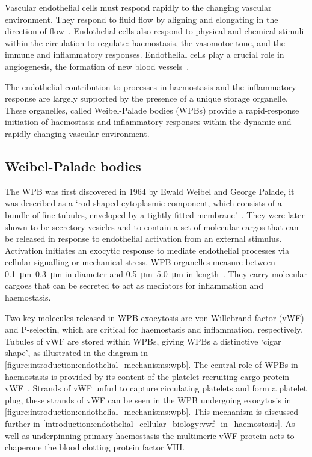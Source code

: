 Vascular endothelial cells must respond rapidly to the changing vascular environment. They respond to fluid flow by aligning and elongating in the direction of flow~\cite{Eskin1984}. Endothelial cells also respond to physical and chemical stimuli within the circulation to regulate: haemostasis, the vasomotor tone, and the immune and inflammatory responses. Endothelial cells play a crucial role in angiogenesis, the formation of new blood vessels~\cite{Sumpio2002}.

The endothelial contribution to processes in haemostasis and the inflammatory response are largely supported by the presence of a unique storage organelle. These organelles, called Weibel-Palade bodies (WPBs) provide a rapid-response initiation of haemostasis and inflammatory responses within the dynamic and rapidly changing vascular environment.

\subsection{Weibel-Palade bodies}
\label{introduction:endothelial_cellular_biology:wpb}
The WPB was first discovered in 1964 by Ewald Weibel and George Palade, it was described as a `rod-shaped cytoplasmic component, which consists of a bundle of fine tubules, enveloped by a tightly fitted membrane'~\cite{Weibel1964}. They were later shown to be secretory vesicles and to contain a set of molecular cargos that can be released in response to endothelial activation from an external stimulus. Activation initiates an exocytic response to mediate endothelial processes via cellular signalling or mechanical stress. WPB organelles measure between \SIrange{0.1}{0.3}{\micro\meter} in diameter and \SIrange{0.5}{5.0}{\micro\meter} in length~\cite{Ferraro2014}. They carry molecular cargoes that can be secreted to act as  mediators for inflammation and haemostasis.

Two key molecules released in WPB exocytosis are von Willebrand factor (vWF) and P-selectin, which are critical for haemostasis and inflammation, respectively. Tubules of vWF are stored within WPBs, giving WPBs a distinctive `cigar shape', as illustrated in the diagram in \autoref{figure:introduction:endothelial_mechanisms:wpb}. The central role of WPBs in haemostasis is provided by its content of the platelet-recruiting cargo protein vWF~\cite{Wagner1982}. Strands of vWF unfurl to capture circulating platelets and form a platelet plug, these strands of vWF can be seen in the WPB undergoing exocytosis in \autoref{figure:introduction:endothelial_mechanisms:wpb}. This mechanism is discussed further in \autoref{introduction:endothelial_cellular_biology:vwf_in_haemostasis}. As well as underpinning primary haemostasis the multimeric vWF protein acts to chaperone the blood clotting protein factor VIII.

